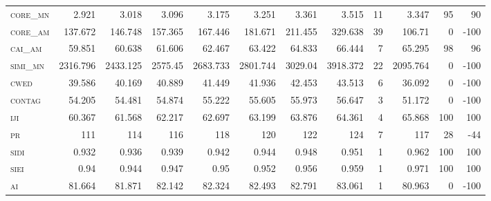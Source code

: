 \begin{landscape}
\begin{table}[!htbp]
\begin{tabular}{@{}lrrrrrrrr|rrr@{}}
\textsc{core\_mn  } & 2.921    & 3.018    & 3.096    & 3.175    & 3.251    & 3.361    & 3.515     & 11     & 3.347         & 95             & 90              \\
\textsc{core\_am  } & 137.672  & 146.748  & 157.365  & 167.446  & 181.671  & 211.455  & 329.638   & 39     & 106.71        & 0              & -100            \\
\textsc{cai\_am   } & 59.851   & 60.638   & 61.606   & 62.467   & 63.422   & 64.833   & 66.444    & 7      & 65.295        & 98             & 96              \\
\textsc{simi\_mn  } & 2316.796 & 2433.125 & 2575.45  & 2683.733 & 2801.744 & 3029.04  & 3918.372  & 22     & 2095.764      & 0              & -100            \\
\textsc{cwed      } & 39.586   & 40.169   & 40.889   & 41.449   & 41.936   & 42.453   & 43.513    & 6      & 36.092        & 0              & -100            \\
\textsc{contag    } & 54.205   & 54.481   & 54.874   & 55.222   & 55.605   & 55.973   & 56.647    & 3      & 51.172        & 0              & -100            \\
\textsc{iji       } & 60.367   & 61.568   & 62.217   & 62.697   & 63.199   & 63.876   & 64.361    & 4      & 65.868        & 100            & 100             \\
\textsc{pr        } & 111      & 114      & 116      & 118      & 120      & 122      & 124       & 7      & 117           & 28             & -44             \\
\textsc{sidi      } & 0.932    & 0.936    & 0.939    & 0.942    & 0.944    & 0.948    & 0.951     & 1      & 0.962         & 100            & 100             \\
\textsc{siei      } & 0.94     & 0.944    & 0.947    & 0.95     & 0.952    & 0.956    & 0.959     & 1      & 0.971         & 100            & 100             \\
\textsc{ai        } & 81.664   & 81.871   & 82.142   & 82.324   & 82.493   & 82.791   & 83.061    & 1      & 80.963        & 0              & -100            \\ \bottomrule
\end{tabular}
\end{table}
\end{landscape}



